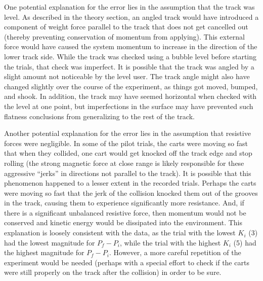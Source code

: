 \documentclass[12pt]{iopart} %
\begin{document}
One potential explanation for the error lies in the assumption that the track was level.
As described in the theory section, an angled track would have introduced a component of weight force parallel to the track that does not get cancelled out (thereby preventing conservation of momentum from applying).
This external force would have caused the system momentum to increase in the direction of the lower track side.
While the track was checked using a bubble level before starting the trials, that check was imperfect.
It is possible that the track was angled by a slight amount not noticeable by the level user.
The track angle might also have changed slightly over the course of the experiment, as things got moved, bumped, and shook.
In addition, the track may have seemed horizontal when checked with the level at one point, but imperfections in the surface may have prevented such flatness conclusions from generalizing to the rest of the track.

Another potential explanation for the error lies in the assumption that resistive forces were negligible.
In some of the pilot trials, the carts were moving so fast that when they collided, one cart would get knocked off the track edge and stop rolling (the strong magnetic force at close range is likely responsible for these aggressive ``jerks'' in directions not parallel to the track).
It is possible that this phenomenon happened to a lesser extent in the recorded trials.
Perhaps the carts were moving so fast that the jerk of the collision knocked them out of the grooves in the track, causing them to experience significantly more resistance.
And, if there is a significant unbalanced resistive force, then momentum would not be conserved and kinetic energy would be dissipated into the environment.
This explanation is loosely consistent with the data, as the trial with the lowest $K_i$ (3) had the lowest magnitude for $P_f - P_i$, while the trial with the highest $K_i$ (5) had the highest magnitude for $P_f - P_i$.
However, a more careful repetition of the experiment would be needed (perhaps with a special effort to check if the carts were still properly on the track after the collision) in order to be sure.
\end{document}
